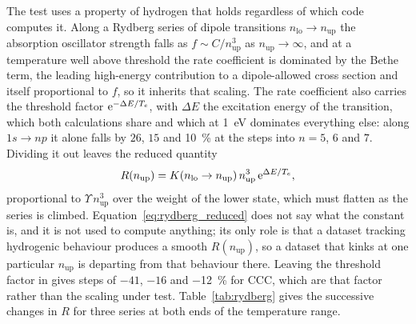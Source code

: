 The test uses a property of hydrogen that holds regardless of which code
computes it. Along a Rydberg series of dipole transitions $n_{\mathrm{lo}} \to
n_{\mathrm{up}}$ the absorption oscillator strength falls as
$f \sim C/n_{\mathrm{up}}^{3}$ as $n_{\mathrm{up}} \to \infty$, and at a
temperature well above threshold the rate coefficient is dominated by the Bethe
term, the leading high-energy contribution to a dipole-allowed cross section and
itself proportional to $f$, so it inherits that scaling. The rate
coefficient also carries the threshold factor $\mathrm{e}^{-\Delta E/T_e}$,
with $\Delta E$ the excitation energy of the transition, which both
calculations share and which at \SI{1}{\electronvolt} dominates everything
else: along $1s \to np$ it alone falls by $26$, $15$ and \SI{10}{\percent} at
the steps into $n = 5$, $6$ and $7$. Dividing it out leaves the reduced
quantity
\begin{equation}
  R(n_{\mathrm{up}}) = K(n_{\mathrm{lo}} \to n_{\mathrm{up}})\,
  n_{\mathrm{up}}^{3}\, \mathrm{e}^{\Delta E/T_e},
  \label{eq:rydberg_reduced}
\end{equation}
proportional to $\Upsilon\,n_{\mathrm{up}}^{3}$ over the weight of the lower
state, which must flatten as the series is climbed.
Equation~\eqref{eq:rydberg_reduced} does not say what the constant is, and it
is not used to compute anything; its only role is that a dataset tracking
hydrogenic behaviour produces a smooth $R(n_{\mathrm{up}})$, so a dataset that
kinks at one particular $n_{\mathrm{up}}$ is departing from that behaviour
there. Leaving the threshold factor in gives steps of $-41$, $-16$ and
\SI{-12}{\percent} for CCC, which are that factor rather than the scaling
under test. Table~\ref{tab:rydberg} gives the successive changes in $R$
for three series at both ends of the temperature range.

